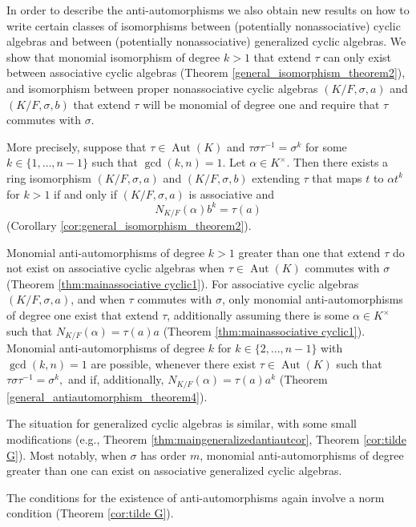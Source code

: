 \documentclass{amsart}
\theoremstyle{plain}
\theoremstyle{definition}
\numberwithin{equation}{section}
\numberwithin{figure}{section}
\DeclareMathOperator{\Aut}{Aut}
\begin{document}
 

In order to describe the anti-automorphisms we also obtain new results on how to write certain classes of isomorphisms between (potentially nonassociative) cyclic algebras and between (potentially nonassociative)  generalized cyclic algebras.  We show that monomial isomorphism
of degree $k>1$ that extend $\tau$ can only exist between associative cyclic algebras  (Theorem \ref{general_isomorphism_theorem2}), and   isomorphism between proper nonassociative cyclic algebras $(K/F,\sigma,a)$ and $ (K/F,\sigma,b)$
 that extend $\tau$ will be monomial of degree one and require that  $\tau$ commutes with $\sigma$.


More precisely, suppose that $\tau\in \Aut(K)$ and $\tau \sigma\tau^{-1}=\sigma^k$ for some $k\in \{1,\dots, n-1 \}$ such that $\gcd (k, n)=1$.
 Let $\alpha\in K^\times$. Then there exists a ring isomorphism $(K/F,\sigma,a)$ and $ (K/F,\sigma,b)$ extending $\tau$ that maps $t$ to $\alpha t^k$ for  $k>1$
  if and only if $(K/F,\sigma,a)$ is associative and
 $$N_{K/F}(\alpha) b^k=\tau(a)$$
 (Corollary  \ref{cor:general_isomorphism_theorem2}).

Monomial  anti-automorphisms of degree $k>1$ greater than one that extend $\tau$ do not exist on associative cyclic algebras when
$\tau\in \Aut(K)$ commutes with $\sigma$ (Theorem \ref{thm:mainassociative cyclic1}).
For associative cyclic algebras $(K/F,\sigma,a)$, and when $\tau$ commutes with $\sigma$, only monomial anti-automorphisms of degree one exist that extend $\tau$, additionally assuming there is some $\alpha\in K^\times$ such that
$N_{K/F}( \alpha)= \tau(a)a$  (Theorem \ref{thm:mainassociative cyclic1}). Monomial anti-automorphisms of degree $k$ for $k\in \{2,\dots, n-1 \}$  with $\gcd(k,n)=1$ are possible, whenever there exist $\tau\in \Aut(K)$ such that
 $\tau \sigma\tau^{-1}=\sigma^k,$
and if, additionally,
  $N_{K/F}(\alpha)=\tau(a)a^{k}$ (Theorem  \ref{general_antiautomorphism_theorem4}). 



The situation for generalized cyclic algebras is similar, with some small modifications (e.g., Theorem \ref{thm:maingeneralizedantiautcor}, Theorem \ref{cor:tilde G}). Most notably,  when $\sigma$ has order $m$,  monomial anti-automorphisms of degree greater than one can exist on associative generalized cyclic algebras. 

The conditions for the existence of anti-automorphisms again involve a norm condition (Theorem \ref{cor:tilde G}).
\end{document}
